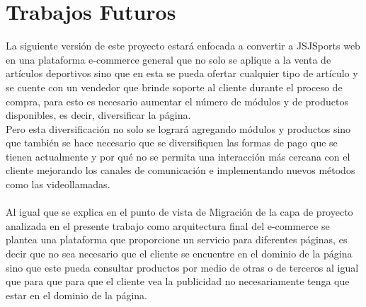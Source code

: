 \chapter{Trabajos Futuros}

La siguiente versión de este proyecto estará enfocada a convertir a JSJSports web en una plataforma e-commerce general que no solo se aplique a la venta de artículos deportivos sino que en esta se pueda ofertar cualquier tipo de artículo y se cuente con un vendedor que brinde soporte al cliente durante el proceso de compra, para esto es necesario aumentar el número de módulos y de productos disponibles, es decir, diversificar la página.\newline
\\
Pero esta diversificación no solo se logrará agregando módulos y productos sino que también se hace necesario que se diversifiquen las formas de pago que se tienen actualmente y por qué no se permita una interacción más cercana con el cliente mejorando los canales de comunicación e implementando nuevos métodos como las videollamadas.\\
\\
Al igual que se explica en el punto de vista de Migración de la capa de proyecto analizada en el presente trabajo como arquitectura final  del e-commerce se plantea una plataforma que proporcione un servicio para diferentes páginas, es decir que no sea necesario que el cliente se encuentre en el dominio de la página sino que este pueda consultar productos por medio de otras o de terceros al igual que para que para que el cliente vea la publicidad no necesariamente tenga que estar en el dominio de la página.